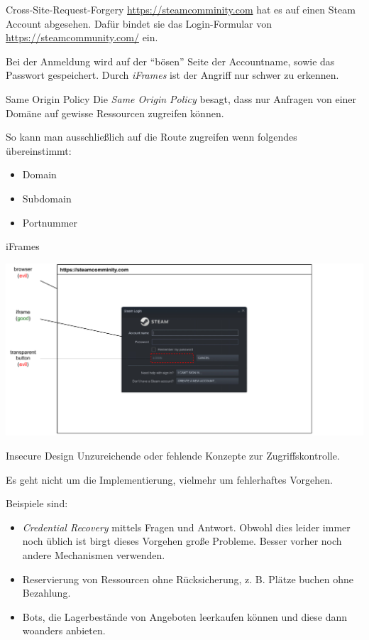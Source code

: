 \begin{example}{Cross-Site-Request-Forgery}
    \href{https://www.youtube.com/watch?v=dQw4w9WgXcQ}{https://steamcomminity.com} hat es auf einen Steam Account abgesehen.
    Dafür bindet sie das Login-Formular von \href{https://steamcommunity.com/}{https://steamcommunity.com/} ein.

    Bei der Anmeldung wird auf der \enquote{bösen} Seite der Accountname, sowie das Passwort gespeichert.
    Durch \emph{iFrames} ist der Angriff nur schwer zu erkennen.
\end{example}

\begin{defi}{Same Origin Policy}
    Die \emph{Same Origin Policy} besagt, dass nur Anfragen von einer Domäne auf gewisse Ressourcen zugreifen können.

    So kann man ausschließlich auf die Route zugreifen wenn folgendes übereinstimmt:
    \begin{itemize}
        \item Domain
        \item Subdomain
        \item Portnummer
    \end{itemize}
\end{defi}

\begin{example}{iFrames}
    \begin{center}
        \includegraphics[width=\textwidth]{includes/figures/example_iframes.pdf}
    \end{center}
\end{example}

\begin{defi}{Insecure Design}
    Unzureichende oder fehlende Konzepte zur Zugriffskontrolle.

    Es geht nicht um die Implementierung, vielmehr um fehlerhaftes Vorgehen.

    Beispiele sind:
    \begin{itemize}
        \item \emph{Credential Recovery} mittels Fragen und Antwort.
              Obwohl dies leider immer noch üblich ist birgt dieses Vorgehen große Probleme.
              Besser vorher noch andere Mechanismen verwenden.
        \item Reservierung von Ressourcen ohne Rücksicherung, z. B. Plätze buchen ohne Bezahlung.
        \item Bots, die Lagerbestände von Angeboten leerkaufen können und diese dann woanders anbieten.
    \end{itemize}
\end{defi}

